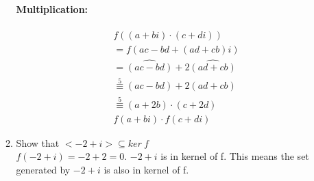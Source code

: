 \documentclass[12pt]{article}
\begin{document}
\begin{enumerate}
\begin{enumerate}
				\paragraph{Multiplication:}
				\begin{align*}
				&f((a+bi) \cdot (c+di)) \\
				&= f(ac-bd + (ad + cb)i)\\
				&= \hat{(ac-bd)} + 2\hat{(ad + cb)}\\
				&\overset{5}{\equiv}(ac-bd) + 2(ad + cb)\\
				&\overset{5}{\equiv}(a+2b)\cdot(c+2d)\\
				&f(a+bi) \cdot f(c+di)
				\end{align*}

			\item Show that $<-2 + i> \subseteq ker\ f$ \\
				$f(-2 + i) = -2 + 2 = 0$. $-2 + i$ is in kernel of f. This means the set
				generated by $-2 + i$ is also in kernel of f.

		\end{enumerate}

\end{enumerate}
\end{document}
